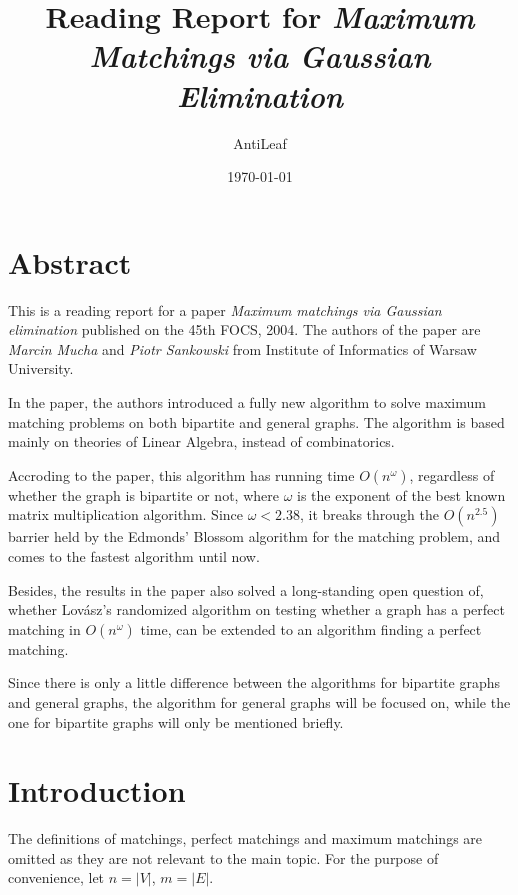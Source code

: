 \documentclass[a4paper]{article}
\title {Reading Report for \emph{Maximum Matchings via Gaussian Elimination}}
\author {AntiLeaf}
\date {\today}
\begin{document}
	
	\maketitle
	\tableofcontents

	\newpage

	\section{Abstract}

		\hspace{2em}This is a reading report for a paper \emph{Maximum matchings via Gaussian elimination} \cite{original} published on the 45th FOCS, 2004. The authors of the paper are \textit{Marcin Mucha} and \textit{Piotr Sankowski} from Institute of Informatics of Warsaw University.
		
		In the paper, the authors introduced a fully new algorithm to solve maximum matching problems on both bipartite and general graphs. The algorithm is based mainly on theories of Linear Algebra, instead of combinatorics.

		Accroding to the paper, this algorithm has running time $O(n^\omega)$, regardless of whether the graph is bipartite or not, where $\omega$ is the exponent of the best known matrix multiplication algorithm. Since $\omega < 2.38$, it breaks through the $O(n^{2.5})$ barrier held by the Edmonds' Blossom algorithm for the matching problem, and comes to the fastest algorithm until now.

		Besides, the results in the paper also solved a long-standing open question of, whether Lov\'asz's randomized algorithm on testing whether a graph has a perfect matching in $O(n^\omega)$ time, can be extended to an algorithm finding a perfect matching.

		Since there is only a little difference between the algorithms for bipartite graphs and general graphs, the algorithm for general graphs will be focused on, while the one for bipartite graphs will only be mentioned briefly.

	\section{Introduction}

		\hspace{2em}The definitions of matchings, perfect matchings and maximum matchings are omitted as they are not relevant to the main topic. For the purpose of convenience, let $n = |V|$, $m = |E|$.
\end{document}
